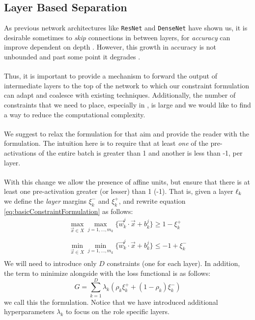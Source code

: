 \subsection{Layer Based Separation \SepLayer}\label{subsec:sepLayer}

As previous network architectures like \texttt{ResNet} and \texttt{DenseNet} have shown us, it is desirable sometimes to \emph{skip} connections in between layers, for \emph{accuracy} can improve dependent on depth \cite{resnet, densenet}. However, this growth in accuracy is not unbounded and past some point it degrades \cite{simpnet}. 
\\\\
Thus, it is important to provide a mechanism to forward the output of intermediate layers to the top of the network to which our constraint formulation can adapt and coalesce with existing techniques. Additionally, the number of constraints that we need to place, especially in \SepUnitPoint, is large and we would like to find a way to reduce the computational complexity.
\\\\
We suggest to relax the \SepUnit formulation for that aim and provide the reader with the \SepLayer formulation. The intuition here is to require that at least \emph{one} of the pre-activations of the entire batch is greater than 1 and another is less than -1, per layer.  
\\\\
With this change we allow the presence of affine units, but ensure that there is at least one pre-activation greater (or lesser) than 1 (-1). That is, given a layer $\ell_k$ we define the \emph{layer} margins $\xi^{-}_k$ and $\xi^{+}_k$, and rewrite equation \ref{eq:basicConstraintFormulation} as follows:
\begin{equation}\label{eq:layerSeparationConstraint}
\begin{array}{lcl}
    \displaystyle\max_{\vec{x}\in{X}}\max_{j=1,\ldots,m_k}\{\vec{w}^j_k\cdot\vec{x}+b^j_k\}\geq 1-\xi^{+}_k\\\\
    \displaystyle\min_{\vec{x}\in{X}}\min_{j=1,\ldots,m_k}\{\vec{w}^j_k\cdot\vec{x}+b^j_k\}\leq -1+\xi^{-}_k\\
\end{array}    
\end{equation}
We will need to introduce only $D$ constraints (one for each layer). In addition, the term to minimize alongside with the loss functional is as follows:
\begin{equation}\label{eq:constraintLossForLayerSeparation}
    G = \sum_{k=1}^{D}\lambda_k(\rho_{k}\xi^{+}_{k}+(1-\rho_{k})\xi^{-}_{k})
\end{equation}
we call this the \SepLayer formulation. Notice that we have introduced additional hyperparameters $\lambda_k$ to focus on the role specific layers.   


